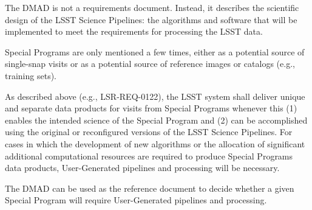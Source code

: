 The DMAD is not a requirements document.
Instead, it describes the scientific design of the LSST Science Pipelines: the algorithms and software that will be implemented to meet the requirements for processing the LSST data. 

Special Programs are only mentioned a few times, either as a potential source of single-snap visits or as a potential source of reference images or catalogs (e.g., training sets).

As described above (e.g., LSR-REQ-0122), the LSST system shall deliver unique and separate data products for visits from Special Programs whenever this (1) enables the intended science of the Special Program and (2) can be accomplished using the original or reconfigured versions of the LSST Science Pipelines.
For cases in which the development of new algorithms or the allocation of significant additional computational resources are required to produce Special Programs data products, User-Generated pipelines and processing will be necessary.

The DMAD can be used as the reference document to decide whether a given Special Program will require User-Generated pipelines and processing.



